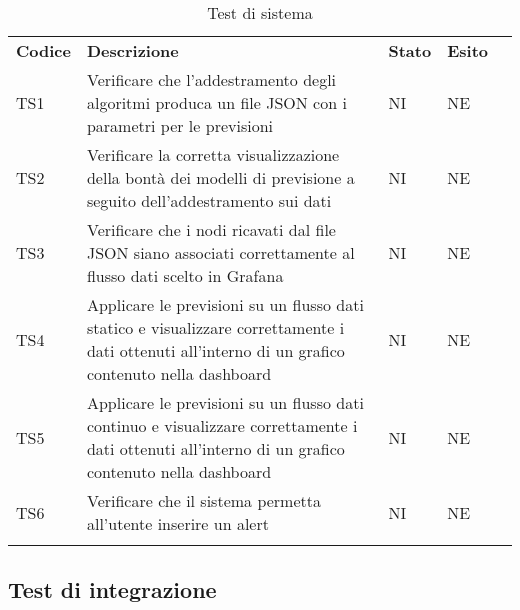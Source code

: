 \begin{longtable} {
		>{}p{15mm} 
		>{}p{79.5mm}
		>{}p{15mm} 
		>{}p{15mm}
		>{}p{0mm}}
	\rowcolor{gray!50}
	\textbf{Codice} & \textbf{Descrizione} & \textbf{Stato} & \textbf{Esito} &\TBstrut \\
	TS1 & Verificare che l'addestramento degli algoritmi produca un file JSON con i parametri per le previsioni & NI & NE  &\TBstrut \\ [2mm]
	TS2 & Verificare la corretta visualizzazione della bontà dei modelli di previsione a seguito dell'addestramento sui dati & NI & NE  &\TBstrut \\ [2mm]
	TS3 & Verificare che i nodi ricavati dal file JSON siano associati correttamente al flusso dati scelto in Grafana\glo & NI & NE  &\TBstrut \\ [2mm]
	TS4 & Applicare le previsioni su un flusso dati statico e visualizzare correttamente i dati ottenuti all'interno di un grafico contenuto nella dashboard\glo & NI & NE  &\TBstrut \\ [2mm]
	TS5 & Applicare le previsioni su un flusso dati continuo e visualizzare correttamente i dati ottenuti all'interno di un grafico contenuto nella dashboard\glo & NI & NE  &\TBstrut \\ [2mm]
	TS6 & Verificare che il sistema permetta all'utente inserire un alert\glo & NI & NE  &\TBstrut \\ [2mm]
	\rowcolor{white}
	\caption{Test di sistema}
\end{longtable}


\subsection{Test di integrazione}

